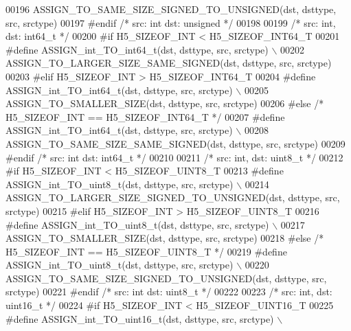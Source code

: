 \begin{DoxyCode}
00196 \textcolor{preprocessor}{        ASSIGN\_TO\_SAME\_SIZE\_SIGNED\_TO\_UNSIGNED(dst, dsttype, src, srctype)}
00197 \textcolor{preprocessor}{#endif }\textcolor{comment}{/* src: int dst: unsigned */}\textcolor{preprocessor}{}
00198 
00199 \textcolor{comment}{/* src: int, dst: int64\_t */}
00200 \textcolor{preprocessor}{#if H5\_SIZEOF\_INT < H5\_SIZEOF\_INT64\_T}
00201 \textcolor{preprocessor}{    #define ASSIGN\_int\_TO\_int64\_t(dst, dsttype, src, srctype) \(\backslash\)}
00202 \textcolor{preprocessor}{        ASSIGN\_TO\_LARGER\_SIZE\_SAME\_SIGNED(dst, dsttype, src, srctype)}
00203 \textcolor{preprocessor}{#elif H5\_SIZEOF\_INT > H5\_SIZEOF\_INT64\_T}
00204 \textcolor{preprocessor}{    #define ASSIGN\_int\_TO\_int64\_t(dst, dsttype, src, srctype) \(\backslash\)}
00205 \textcolor{preprocessor}{        ASSIGN\_TO\_SMALLER\_SIZE(dst, dsttype, src, srctype)}
00206 \textcolor{preprocessor}{#else }\textcolor{comment}{/* H5\_SIZEOF\_INT == H5\_SIZEOF\_INT64\_T */}\textcolor{preprocessor}{}
00207 \textcolor{preprocessor}{    #define ASSIGN\_int\_TO\_int64\_t(dst, dsttype, src, srctype) \(\backslash\)}
00208 \textcolor{preprocessor}{        ASSIGN\_TO\_SAME\_SIZE\_SAME\_SIGNED(dst, dsttype, src, srctype)}
00209 \textcolor{preprocessor}{#endif }\textcolor{comment}{/* src: int dst: int64\_t */}\textcolor{preprocessor}{}
00210 
00211 \textcolor{comment}{/* src: int, dst: uint8\_t */}
00212 \textcolor{preprocessor}{#if H5\_SIZEOF\_INT < H5\_SIZEOF\_UINT8\_T}
00213 \textcolor{preprocessor}{    #define ASSIGN\_int\_TO\_uint8\_t(dst, dsttype, src, srctype) \(\backslash\)}
00214 \textcolor{preprocessor}{        ASSIGN\_TO\_LARGER\_SIZE\_SIGNED\_TO\_UNSIGNED(dst, dsttype, src, srctype)}
00215 \textcolor{preprocessor}{#elif H5\_SIZEOF\_INT > H5\_SIZEOF\_UINT8\_T}
00216 \textcolor{preprocessor}{    #define ASSIGN\_int\_TO\_uint8\_t(dst, dsttype, src, srctype) \(\backslash\)}
00217 \textcolor{preprocessor}{        ASSIGN\_TO\_SMALLER\_SIZE(dst, dsttype, src, srctype)}
00218 \textcolor{preprocessor}{#else }\textcolor{comment}{/* H5\_SIZEOF\_INT == H5\_SIZEOF\_UINT8\_T */}\textcolor{preprocessor}{}
00219 \textcolor{preprocessor}{    #define ASSIGN\_int\_TO\_uint8\_t(dst, dsttype, src, srctype) \(\backslash\)}
00220 \textcolor{preprocessor}{        ASSIGN\_TO\_SAME\_SIZE\_SIGNED\_TO\_UNSIGNED(dst, dsttype, src, srctype)}
00221 \textcolor{preprocessor}{#endif }\textcolor{comment}{/* src: int dst: uint8\_t */}\textcolor{preprocessor}{}
00222 
00223 \textcolor{comment}{/* src: int, dst: uint16\_t */}
00224 \textcolor{preprocessor}{#if H5\_SIZEOF\_INT < H5\_SIZEOF\_UINT16\_T}
00225 \textcolor{preprocessor}{    #define ASSIGN\_int\_TO\_uint16\_t(dst, dsttype, src, srctype) \(\backslash\)}

\end{DoxyCode}

